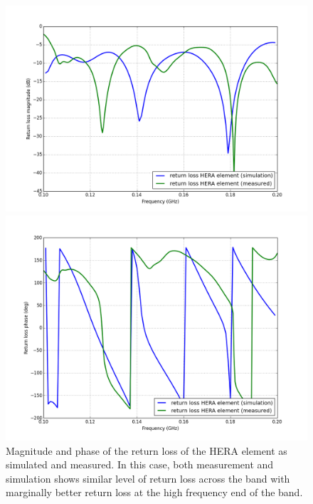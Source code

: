 \documentclass[twocolumn]{emulateapj}
\begin{document}
\begin{figure}[ht]
\begin{minipage}[b]{\linewidth}
\centering
\includegraphics[angle=0, width=\linewidth]{plots/HERA_meas_sim_mag.png}
\end{minipage}
\vspace{0.1cm}
\begin{minipage}[b]{\linewidth}
\centering
\includegraphics[angle=0, width=\linewidth]{plots/HERA_meas_sim_ph.png}
\end{minipage}
\caption{Magnitude and phase of the return loss of the HERA element as simulated and measured. In this case, both measurement and simulation shows similar level of return loss across the band with marginally better return loss at the high frequency end of the band. }   
\label{meas_sim_RL_HERA}
\end{figure}
\end{document}
